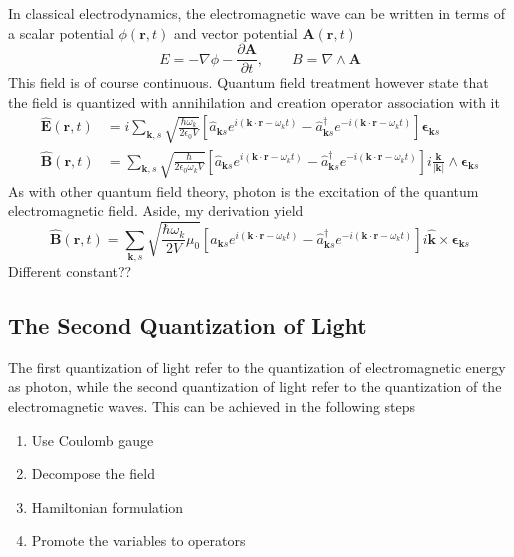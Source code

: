 \documentclass[../../../main.tex]{subfiles}
\begin{document}
In classical electrodynamics, the electromagnetic wave can be written in terms of a scalar potential $\phi(\mathbf{r}, t)$ and vector potential $\mathbf{A}(\mathbf{r},t)$
\begin{equation*}
  E = -\nabla \phi - \frac{\partial \mathbf{A}}{\partial t},\qquad
  B = \nabla \land \mathbf{A}
\end{equation*}
This field is of course continuous.
Quantum field treatment however state that the field is quantized with annihilation and creation operator association with it
\begin{align*}
  \hat{\mathbf{E}}(\mathbf{r}, t) & =  i \sum_{\mathbf{k},s} \sqrt{\frac{\hbar \omega_k}{2 \epsilon_0 V}} \left[ \hat{a}_{\mathbf{k}s} e^{i(\mathbf{k} \cdot \mathbf{r} - \omega_k t)} - \hat{a}_{\mathbf{k}s}^{\dagger} e^{-i(\mathbf{k} \cdot \mathbf{r} - \omega_k t)} \right] \boldsymbol{\epsilon}_{\mathbf{k}s}                                        \\
  \hat{\mathbf{B}}(\mathbf{r}, t) & =  \sum_{\mathbf{k},s} \sqrt{\frac{\hbar}{2 \epsilon_0 \omega_k V}} \left[ \hat{a}_{\mathbf{k}s} e^{i(\mathbf{k} \cdot \mathbf{r} - \omega_k t)} - \hat{a}_{\mathbf{k}s}^{\dagger} e^{-i(\mathbf{k} \cdot \mathbf{r} - \omega_k t)} \right] i \frac{\mathbf{k}}{|\mathbf{k}|} \wedge \boldsymbol{\epsilon}_{\mathbf{k}s}
\end{align*}
As with other quantum field theory, photon is the excitation of the quantum electromagnetic field.
Aside, my derivation yield
\begin{equation*}
  \hat{\mathbf{B}}(\mathbf{r}, t) =  \sum_{\mathbf{k},s} \sqrt{\frac{\hbar \omega_k}{2 V} \mu_0} \left[ \hat{a}_{\mathbf{k}s} e^{i(\mathbf{k} \cdot \mathbf{r} - \omega_k t)} - \hat{a}_{\mathbf{k}s}^{\dagger} e^{-i(\mathbf{k} \cdot \mathbf{r} - \omega_k t)} \right] i \mathbf{\hat{k}} \times \boldsymbol{\epsilon}_{\mathbf{k}s}
\end{equation*}
Different constant??

\subsection{The Second Quantization of Light}
The first quantization of light refer to the quantization of electromagnetic energy as photon, while the second quantization of light refer to the quantization of the electromagnetic waves.
This can be achieved in the following steps
\begin{enumerate}
  \item Use Coulomb gauge
  \item Decompose the field
  \item Hamiltonian formulation
  \item Promote the variables to operators
\end{enumerate}
\end{document}
